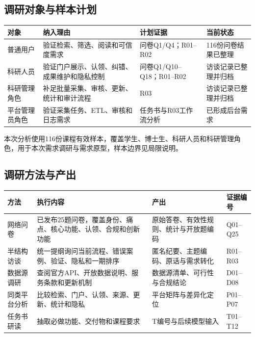 \documentclass[UTF8,11pt,a4paper]{ctexart}
\begin{document}
\subsection{调研对象与样本计划}
\begin{longtable}{p{2.6cm}p{4.8cm}p{4.2cm}p{2.4cm}}
\toprule 对象 & 纳入理由 & 计划证据 & 当前状态\\\midrule
普通用户 & 验证检索、筛选、阅读和可信度需求 & 问卷Q1/Q4；R01--R02 & 116份问卷结果已整理\\
科研人员 & 验证门户展示、认领、纠错、成果维护和隐私控制 & 问卷Q1/Q10--Q18；R01--R02 & 访谈记录已整理并归档\\
科研管理角色 & 补足批量采集、审核、更新、统计和审计流程 & R03 & 访谈记录已整理并归档\\
平台管理员角色 & 验证采集任务、ETL、审核和日志需求 & 任务书与R03工作流分析 & 已形成后台需求\\\bottomrule
\end{longtable}
本次分析使用116份课程有效样本，覆盖学生、博士生、科研人员和科研管理角色，用于本次需求调研与需求原型，样本边界见局限说明。

\subsection{调研方法与产出}
\begin{longtable}{p{2.1cm}p{6.2cm}p{4.5cm}p{2.0cm}}
\toprule 方法 & 执行内容 & 产出 & 证据编号\\\midrule
网络问卷 & 已发布25题问卷，覆盖身份、痛点、核心功能、认领、合规和创新功能 & 原始答卷、有效性规则、统计与开放题编码 & Q01--Q25\\
半结构访谈 & 统一提纲询问当前流程、错误案例、验证、隐私和一期排序 & 匿名纪要、主题编码、原话与需求转化 & R01--R03\\
数据源调研 & 查阅官方API、开放数据说明、服务条款和更新机制 & 数据源清单、可行性与合规结论 & D01--D08\\
同类平台分析 & 比较检索、门户、认领、来源、更新、统计和隐私 & 平台矩阵与差异化定位 & P01--P07\\
任务书研读 & 抽取必做功能、交付物和课程要求 & T编号与后续模型输入 & T01--T12\\\bottomrule
\end{longtable}
\end{document}
